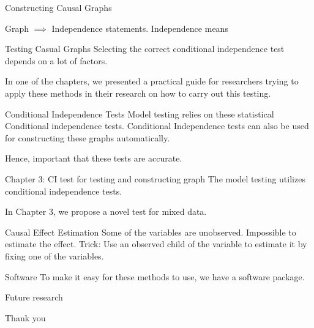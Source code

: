 \documentclass[aspectratio=169]{beamer}
\begin{document}
\begin{frame}{Constructing Causal Graphs}
	
	Graph $ \implies $ Independence statements.
	Independence means 
\end{frame}

\begin{frame}{Testing Casual Graphs}
	Selecting the correct conditional independence test depends on a lot of factors.

	In one of the chapters, we presented a practical guide for researchers trying to apply these methods in their research on how to carry out this testing.
\end{frame}

\begin{frame}{Conditional Independence Tests}
	Model testing relies on these statistical Conditional independence tests.
	Conditional Independence tests can also be used for constructing these graphs
	automatically.

	Hence, important that these tests are accurate.
\end{frame}

\begin{frame}{Chapter 3: CI test for testing and constructing graph}
	The model testing utilizes conditional independence tests.

	In Chapter 3, we propose a novel test for mixed data.
\end{frame}

\begin{frame}{Causal Effect Estimation}
	Some of the variables are unobserved.
	Impossible to estimate the effect.
	Trick: Use an observed child of the variable to estimate it by fixing one of the
	variables.
\end{frame}

\begin{frame}{Software}
	To make it easy for these methods to use, we have a software package.
\end{frame}

\begin{frame}{Future research}
\end{frame}

\begin{frame}
	\Huge{Thank you}
\end{frame}
\end{document}
